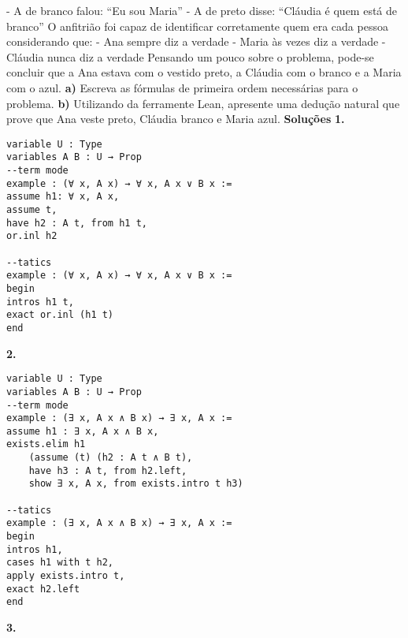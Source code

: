 \newline - A de branco falou: “Eu sou Maria”
\newline - A de preto disse:  “Cláudia é quem está de branco”
\newline O anfitrião foi capaz de identificar corretamente quem era cada pessoa
considerando que:
\newline - Ana sempre diz a verdade
\newline - Maria às vezes diz a verdade
\newline - Cláudia nunca diz a verdade
\newline Pensando um pouco sobre o problema, pode-se concluir que a Ana estava
com o vestido preto, a Cláudia com o branco e a Maria com o
azul.  
\newline \textbf{a)} Escreva as fórmulas de primeira ordem necessárias para o problema.
\newline \textbf{b)} Utilizando da ferramente Lean, apresente uma
dedução natural que prove que Ana veste preto, Cláudia
branco e Maria azul.
\newline \textbf{Soluções}
\newline \textbf{1.}
\begin{lstlisting}
variable U : Type
variables A B : U → Prop
--term mode
example : (∀ x, A x) → ∀ x, A x ∨ B x :=
assume h1: ∀ x, A x,
assume t,
have h2 : A t, from h1 t,
or.inl h2

--tatics
example : (∀ x, A x) → ∀ x, A x ∨ B x :=
begin
intros h1 t,
exact or.inl (h1 t)
end
\end{lstlisting}
\textbf{2.}
\begin{lstlisting}
variable U : Type
variables A B : U → Prop
--term mode
example : (∃ x, A x ∧ B x) → ∃ x, A x :=
assume h1 : ∃ x, A x ∧ B x,
exists.elim h1
    (assume (t) (h2 : A t ∧ B t),
    have h3 : A t, from h2.left,
    show ∃ x, A x, from exists.intro t h3)
    
--tatics
example : (∃ x, A x ∧ B x) → ∃ x, A x :=
begin
intros h1,
cases h1 with t h2,
apply exists.intro t,
exact h2.left
end    
\end{lstlisting}
\textbf{3.}
